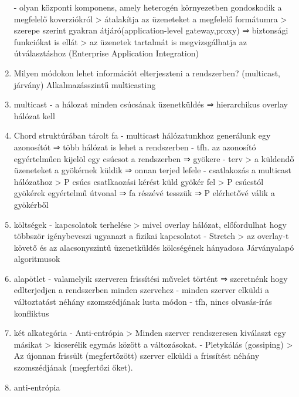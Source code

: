 \documentclass[twoside, a4paper, 12pt]{article}
\begin{document}
\begin{enumerate}
                - olyan központi komponens, amely heterogén környezetben gondoskodik a megfelelő koverziókról
                > átalakítja az üzeneteket a megfelelő formátumra
                > szerepe szerint gyakran átjáró(application-level gateway,proxy) ⇒ biztonsági funkciókat is ellát
                > az üzenetek tartalmát is megvizsgálhatja az útválasztáshoz (Enterprise Application Integration)	
            \item  Milyen módokon lehet információt elterjeszteni a rendszerben? (multicast, járvány)
                Alkalmazásszintű multicasting
            \item multicast 
                - a hálozat minden csúcsának üzenetküldés
                ⇒ hierarchikus overlay hálózat kell
            \item Chord struktúrában tárolt fa
                - multicast hálózatunkhoz generálunk egy azonosítót ⇒ több hálózat is lehet a rendszerben
                - tfh. az azonosító egyértelműen kijelöl egy csúcsot a rendszerben ⇒ gyökere
                - terv
                > a küldendő üzeneteket a gyökérnek küldik ⇒ onnan terjed lefele
                - csatlakozás a multicast hálózathoz
                > P csúcs csatlkaozási kérést küld gyökér fel
                > P csúcstól gyökérek egyértelmű útvonal ⇒ fa részévé tesszük
                ⇒ P elérhetővé válik a gyökérből
            \item költségek
                - kapcsolatok terhelése
                > mivel overlay hálózat, előfordulhat hogy többször igénybeveszi ugyanazt a fizikai kapcsolatot
                - Stretch 
                > az overlay-t követő és az alacsonyszintű üzenetküldés kölcségének hányadosa
                Járványalapó algoritmusok
            \item alapötlet
                - valamelyik szerveren frissítési művelet történt 
                ⇒ szeretnénk hogy edlterjedjen a rendszerben minden szervehez
                - minden szerver elküldi a változtatást néhány szomszédjának lusta módon
                - tfh, nincs olvasás-írás konfliktus
            \item két alkategória
                - Anti-entrópia
                > Minden szerver rendszeresen kiválaszt egy másikat
                > kicserélik egymás között a változásokat.
                - Pletykálás (gossiping)
                > Az újonnan frissült (megfertőzött) szerver elküldi a frissítést néhány szomszédjának (megfertőzi őket).
            \item anti-entrópia

\end{enumerate}
\end{document}
